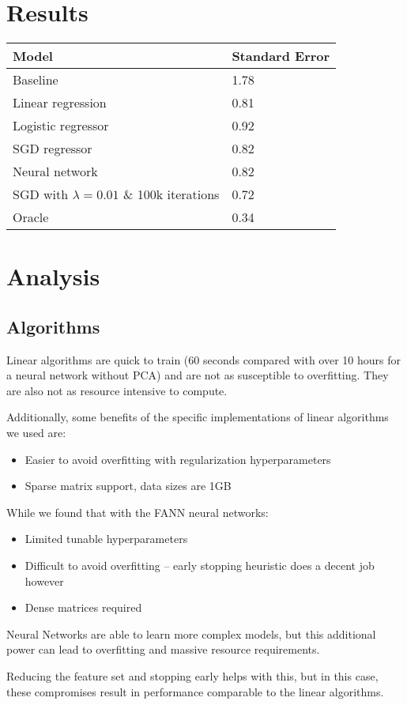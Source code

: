 \documentclass[journal]{IEEEtran}
\begin{document}
\section{Results}
\smallskip
\begin{center}
\begin{tabular}{|l | l|} %
\hline
Model               & Standard Error  \\ [0.5ex] %
\hline
Baseline            & 1.78 \\
\hline
Linear regression  & 0.81 \\
Logistic regressor  & 0.92 \\
SGD regressor       & 0.82 \\
Neural network      & 0.82 \\
SGD with $ \lambda = 0.01 $ \& 100k iterations & 0.72 \\
\hline
Oracle              & 0.34 \\
\hline %
\end{tabular}
\end{center}
\smallskip


\section{Analysis}

\subsection{Algorithms}
Linear algorithms are quick to train (60 seconds compared with over 10 hours
for a neural network without PCA) and are not as susceptible to overfitting.
They are also not as resource intensive to compute.
\\
\par Additionally, some benefits of the specific implementations of linear algorithms we used are:
\begin{itemize}
    \item Easier to avoid overfitting with regularization hyperparameters
    \item Sparse matrix support, data sizes are 1GB
\end{itemize}
\bigskip
\par While we found that with the FANN neural networks:
\begin{itemize}
    \item Limited tunable hyperparameters
    \item Difficult to avoid overfitting -- early stopping heuristic does a decent job however
    \item Dense matrices required
\end{itemize}
\bigskip
\par Neural Networks are able to learn more complex models, but this additional
power can lead to overfitting and massive resource requirements.
\\
\par Reducing the feature set and stopping early helps with this, but in this
case, these compromises result in performance comparable to the linear
algorithms.
\end{document}
